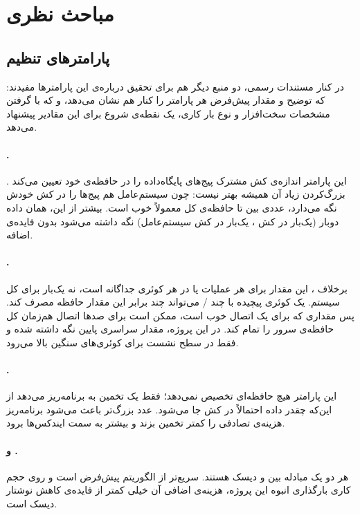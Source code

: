 \section{مباحث نظری}
\label{sec:theory}

\subsection{پارامترهای تنظیم }

در کنار مستندات رسمی، دو منبع دیگر هم برای تحقیق درباره‌ی این پارامترها مفیدند:  \cite{pgconfig} که توضیح و مقدار پیش‌فرض هر پارامتر را کنار هم نشان می‌دهد، و  \cite{pgtune} که با گرفتن مشخصات سخت‌افزار و نوع بار کاری، یک نقطه‌ی شروع برای این مقادیر پیشنهاد می‌دهد.

\paragraph{.} این پارامتر اندازه‌ی کش مشترک پیج‌های پایگاه‌داده را در حافظه‌ی خود  تعیین می‌کند \cite{pgresource}. بزرگ‌کردن زیاد آن همیشه بهتر نیست: چون سیستم‌عامل هم پیج‌ها را در کش خودش نگه می‌دارد، عددی بین  تا  حافظه‌ی کل معمولاً خوب است. بیشتر از این، همان داده دوبار (یک‌بار در کش ، یک‌بار در کش سیستم‌عامل) نگه داشته می‌شود بدون فایده‌ی اضافه.

\paragraph{.} برخلاف ، این مقدار برای هر عملیات  یا  در هر کوئری جداگانه است، نه یک‌بار برای کل سیستم. یک کوئری پیچیده با چند / می‌تواند چند برابر این مقدار حافظه مصرف کند. پس مقداری که برای یک اتصال خوب است، ممکن است برای صدها اتصال هم‌زمان کل حافظه‌ی سرور را تمام کند. در این پروژه، مقدار سراسری پایین نگه داشته شده و فقط در سطح نشست برای کوئری‌های سنگین بالا می‌رود.

\paragraph{.} این پارامتر هیچ حافظه‌ای تخصیص نمی‌دهد؛ فقط یک تخمین به برنامه‌ریز می‌دهد از این‌که چقدر داده احتمالاً در کش جا می‌شود. عدد بزرگ‌تر باعث می‌شود برنامه‌ریز هزینه‌ی  تصادفی را کمتر تخمین بزند و بیشتر به سمت ایندکس‌ها برود.

\paragraph{ و .} هر دو یک مبادله بین  و  دیسک هستند.  سریع‌تر از الگوریتم پیش‌فرض  است و روی حجم کاری بارگذاری انبوه این پروژه، هزینه‌ی  اضافی آن خیلی کمتر از فایده‌ی کاهش نوشتار دیسک است.

